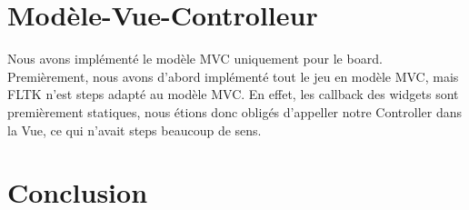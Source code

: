 \documentclass[utf8]{article}
\begin{document}
\begin{large}
\section{Modèle-Vue-Controlleur}
\par
\indent
Nous avons implémenté le modèle MVC uniquement pour le board. Premièrement, nous
avons d'abord implémenté tout le jeu en modèle MVC, mais FLTK n'est steps adapté
au modèle MVC. En effet, les callback des widgets sont premièrement statiques,
nous étions donc obligés d'appeller notre Controller dans la Vue, ce qui n'avait
steps beaucoup de sens.
\par
\section{Conclusion}
\par
\indent

\par

\end{large}
\end{document}
